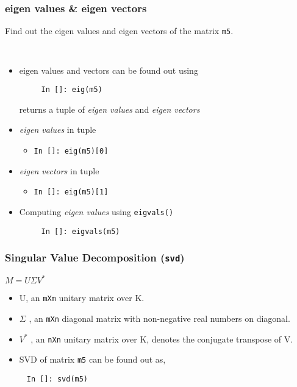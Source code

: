 \documentclass[presentation]{beamer}
\begin{document}
\begin{frame}[fragile]
\frametitle{eigen values \& eigen vectors}
\label{sec-12}

  Find out the eigen values and eigen vectors of the matrix \texttt{m5}.
\begin{verbatim}
   
\end{verbatim}

\begin{itemize}
\item eigen values and vectors can be found out using
\begin{verbatim}
     In []: eig(m5)
\end{verbatim}

    returns a tuple of \emph{eigen values} and \emph{eigen vectors}
\item \emph{eigen values} in tuple

\begin{itemize}
\item \texttt{In []: eig(m5)[0]}
\end{itemize}

\item \emph{eigen vectors} in tuple

\begin{itemize}
\item \texttt{In []: eig(m5)[1]}
\end{itemize}

\item Computing \emph{eigen values} using \texttt{eigvals()}
\begin{verbatim}
     In []: eigvals(m5)
\end{verbatim}

\end{itemize}
\end{frame}
\begin{frame}[fragile]
\frametitle{Singular Value Decomposition (\texttt{svd})}
\label{sec-13}

    $M = U \Sigma V^*$
\begin{itemize}
\item U, an \texttt{mXm} unitary matrix over K.
\item $\Sigma$
        , an \texttt{mXn} diagonal matrix with non-negative real numbers on diagonal.
\item $V^*$
        , an \texttt{nXn} unitary matrix over K, denotes the conjugate transpose of V.
\item SVD of matrix \texttt{m5} can be found out as,
\end{itemize}

\begin{verbatim}
     In []: svd(m5)
\end{verbatim}
\end{frame}
\end{document}
